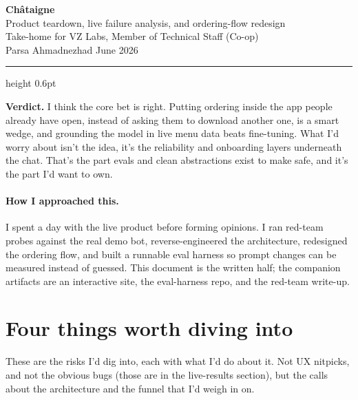 \documentclass[11pt]{article}
\begin{document}
\begin{center}
{\Huge\bfseries\color{ink} Ch\^ataigne}\\[4pt]
{\Large\color{green} Product teardown, live failure analysis, and ordering-flow redesign}\\[10pt]
{\color{ink2} Take-home for VZ Labs, Member of Technical Staff (Co-op)}\\[2pt]
{\color{ink2} Parsa Ahmadnezhad \quad\textbullet\quad June 2026}
\end{center}
\vspace{4pt}
\hrule height 0.6pt
\vspace{10pt}

\begin{verdict}
\textbf{Verdict.} I think the core bet is right. Putting ordering inside the app people already have
open, instead of asking them to download another one, is a smart wedge, and grounding the model in
live menu data beats fine-tuning. What I'd worry about isn't the idea, it's the reliability and
onboarding layers underneath the chat. That's the part evals and clean abstractions exist to make
safe, and it's the part I'd want to own.
\end{verdict}

\paragraph{How I approached this.} I spent a day with the live product before forming opinions. I ran red-team
probes against the real demo bot, reverse-engineered the architecture, redesigned the ordering flow,
and built a runnable eval harness so prompt changes can be measured instead of guessed. This document
is the written half; the companion artifacts are an interactive site, the eval-harness repo, and the
red-team write-up.

\section{Four things worth diving into}

These are the risks I'd dig into, each with what I'd do about it. Not UX nitpicks, and not the obvious
bugs (those are in the live-results section), but the calls about the architecture and the funnel that
I'd weigh in on.
\end{document}

